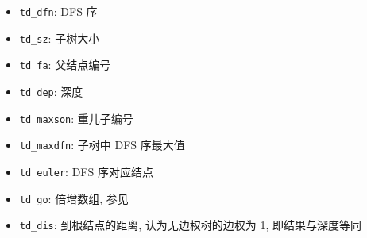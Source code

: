 \begin{itemize}
    \item \verb|td_dfn|: DFS 序
    \item \verb|td_sz|: 子树大小
    \item \verb|td_fa|: 父结点编号
    \item \verb|td_dep|: 深度
    \item \verb|td_maxson|: 重儿子编号
    \item \verb|td_maxdfn|: 子树中 DFS 序最大值
    \item \verb|td_euler|: DFS 序对应结点
    \item \verb|td_go|: 倍增数组, 参见 
    \item \verb|td_dis|: 到根结点的距离, 认为无边权树的边权为 1, 即结果与深度等同
\end{itemize}
